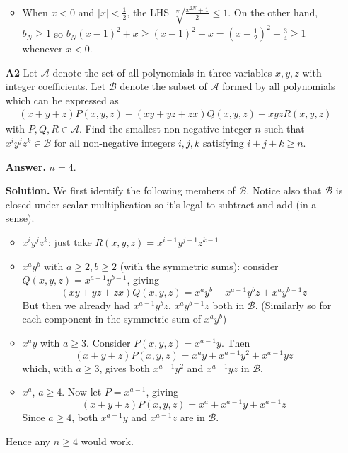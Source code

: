 \documentclass[11pt,a4paper]{article}
\begin{document}
\begin{enumerate}
\begin{itemize}
		\item When $x<0$ and $|x|<\frac 12$, the LHS $\sqrt[N]{\frac{x^{2 N}+1}{2}} \le 1$. 
		On the other hand, $b_N\ge 1$ so $b_N(x-1)^2+x\ge (x-1)^2+x=(x-\frac 12)^2+\frac 34\ge 1$ whenever $x<0$. 
	\end{itemize}
	
	\item [\textbf{A2}] Let $\mathcal{A}$ denote the set of all polynomials in three variables $x, y, z$ with integer coefficients. Let $\mathcal{B}$ denote the subset of $\mathcal{A}$ formed by all polynomials which can be expressed as
	\begin{align*}
	(x + y + z)P(x, y, z) + (xy + yz + zx)Q(x, y, z) + xyzR(x, y, z)
	\end{align*}with $P, Q, R \in \mathcal{A}$. Find the smallest non-negative integer $n$ such that $x^i y^j z^k \in \mathcal{B}$ for all non-negative integers $i, j, k$ satisfying $i + j + k \geq n$.
	
	\textbf{Answer.} $n=4$. 
	
	\textbf{Solution.} We first identify the following members of $\mathcal{B}$. 
	Notice also that $\mathcal{B}$ is closed under scalar multiplication so it's legal to subtract and add (in a sense). 
	\begin{itemize}
		\item $x^iy^jz^k$: just take $R(x, y, z)=x^{i-1}y^{j-1}z^{k-1}$
		
		\item $x^ay^b$ with $a\ge 2, b\ge 2$ (with the symmetric sums): consider 
		$Q(x, y, z)=x^{a-1}y^{b-1}$, giving 
		\[
		(xy + yz + zx)Q(x, y, z) = x^ay^b+x^{a-1}y^{b}z+x^{a}y^{b-1}z
		\]
		But then we already had $x^{a-1}y^{b}z$, $x^{a}y^{b-1}z$ both in $\mathcal{B}$. 
		(Similarly so for each component in the symmetric sum of $x^ay^b$)
		
		\item $x^ay$ with $a\ge 3$. 
		Consider $P(x, y, z)=x^{a-1}y$. Then 
		\[
		(x + y + z)P(x, y, z)=x^ay+x^{a-1}y^2+x^{a-1}yz
		\]
		which, with $a\ge 3$, gives both $x^{a-1}y^2$ and $x^{a-1}yz$ in $\mathcal{B}$. 
		
		\item$x^a$, $a\ge 4$. 
		Now let $P=x^{a-1}$, giving 
		\[
		(x + y + z)P(x, y, z)=x^a+x^{a-1}y+x^{a-1}z
		\]
		Since $a\ge 4$, both $x^{a-1}y$ and $x^{a-1}z$ are in $\mathcal{B}$. 
	\end{itemize}
    Hence any $n\ge 4$ would work. 
    

\end{enumerate}
\end{document}
